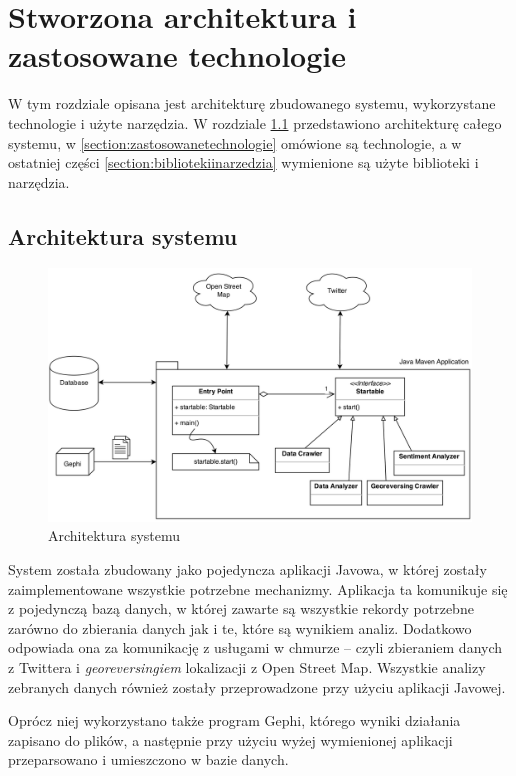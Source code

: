 \chapter{Stworzona architektura i zastosowane technologie}
\label{chapter:architektura}
W tym rozdziale opisana jest architekturę zbudowanego systemu, wykorzystane
technologie i użyte narzędzia.
W rozdziale \ref{section:architekturasystemu} przedstawiono architekturę całego
systemu, w \ref{section:zastosowanetechnologie} omówione są technologie, a w
ostatniej części \ref{section:bibliotekiinarzedzia} wymienione są użyte biblioteki i
narzędzia.
\section{Architektura systemu}
\label{section:architekturasystemu}

\begin{figure}[ht!] \centering
\includegraphics[width=140mm]{img/architektura.png}
\caption{Architektura systemu}
\label{image:architektura-systemu}
\end{figure}
System została zbudowany jako pojedyncza aplikacji Javowa, w której zostały
zaimplementowane wszystkie potrzebne mechanizmy.
Aplikacja ta komunikuje się z pojedynczą bazą danych, w której zawarte są
wszystkie rekordy potrzebne zarówno do zbierania danych jak i te, które są
wynikiem analiz. Dodatkowo odpowiada ona za komunikację z usługami w chmurze --
czyli zbieraniem danych z Twittera i \textit{georeversingiem} lokalizacji
 z Open Street Map. Wszystkie analizy zebranych
danych również zostały przeprowadzone przy użyciu aplikacji Javowej.

Oprócz niej wykorzystano także program Gephi, którego wyniki działania zapisano
do plików, a następnie przy użyciu wyżej wymienionej aplikacji przeparsowano i
umieszczono w bazie danych.

